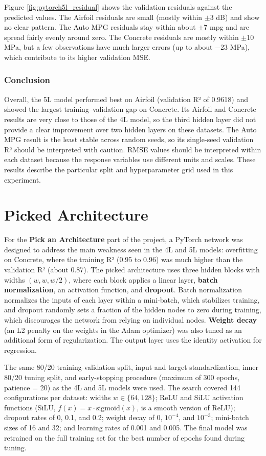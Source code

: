 \documentclass{article}
\begin{document}
Figure \ref{fig:pytorch5l_residual} shows the validation residuals against the predicted values. The Airfoil residuals are small (mostly within $\pm$3 dB) and show no clear pattern. The Auto MPG residuals stay within about $\pm$7 mpg and are spread fairly evenly around zero. The Concrete residuals are mostly within $\pm$10 MPa, but a few observations have much larger errors (up to about $-$23 MPa), which contribute to its higher validation MSE.

\subsubsection{Conclusion}
Overall, the 5L model performed best on Airfoil (validation R² of 0.9618) and showed the largest training--validation gap on Concrete. Its Airfoil and Concrete results are very close to those of the 4L model, so the third hidden layer did not provide a clear improvement over two hidden layers on these datasets. The Auto MPG result is the least stable across random seeds, so its single-seed validation R² should be interpreted with caution. RMSE values should be interpreted within each dataset because the response variables use different units and scales. These results describe the particular split and hyperparameter grid used in this experiment.

\section{Picked Architecture}
For the \textbf{Pick an Architecture} part of the project, a PyTorch network was designed to address the main weakness seen in the 4L and 5L models: overfitting on Concrete, where the training R² (0.95 to 0.96) was much higher than the validation R² (about 0.87). The picked architecture uses three hidden blocks with widths $(w, w, w/2)$, where each block applies a linear layer, \textbf{batch normalization}, an activation function, and \textbf{dropout}. Batch normalization normalizes the inputs of each layer within a mini-batch, which stabilizes training, and dropout randomly sets a fraction of the hidden nodes to zero during training, which discourages the network from relying on individual nodes. \textbf{Weight decay} (an L2 penalty on the weights in the Adam optimizer) was also tuned as an additional form of regularization. The output layer uses the identity activation for regression.
\medskip

The same 80/20 training-validation split, input and target standardization, inner 80/20 tuning split, and early-stopping procedure (maximum of 300 epochs, patience = 20) as the 4L and 5L models were used. The search covered 144 configurations per dataset: widths $w \in \{64, 128\}$; ReLU and SiLU activation functions (SiLU, $f(x) = x \cdot \mathrm{sigmoid}(x)$, is a smooth version of ReLU); dropout rates of 0, 0.1, and 0.2; weight decay of 0, $10^{-4}$, and $10^{-3}$; mini-batch sizes of 16 and 32; and learning rates of 0.001 and 0.005. The final model was retrained on the full training set for the best number of epochs found during tuning.
\end{document}
